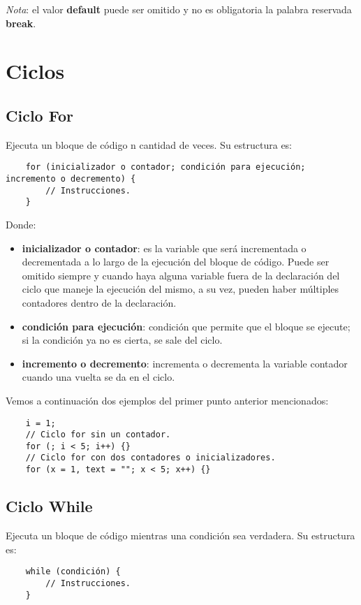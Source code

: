 \textit{Nota}: el valor \textbf{default} puede ser omitido y no es obligatoria la palabra reservada \textbf{break}.



\section{Ciclos}

\subsection{Ciclo For}
\hspace{0.55cm}Ejecuta un bloque de código n cantidad de veces. Su estructura es:
\begin{lstlisting}
    for (inicializador o contador; condición para ejecución; incremento o decremento) {
        // Instrucciones.
    }
\end{lstlisting}

Donde:
\begin{itemize}
    \item \textbf{inicializador o contador}: es la variable que será incrementada o decrementada a lo largo de la ejecución del bloque de código. Puede ser omitido siempre y cuando haya alguna variable fuera de la declaración del ciclo que maneje la ejecución del mismo, a su vez, pueden haber múltiples contadores dentro de la declaración.
    \item \textbf{condición para ejecución}: condición que permite que el bloque se ejecute; si la condición ya no es cierta, se sale del ciclo.
    \item \textbf{incremento o decremento}: incrementa o decrementa la variable contador cuando una vuelta se da en el ciclo.
\end{itemize}

Vemos a continuación dos ejemplos del primer punto anterior mencionados:
\begin{lstlisting}
    i = 1;
    // Ciclo for sin un contador.
    for (; i < 5; i++) {}
    // Ciclo for con dos contadores o inicializadores.
    for (x = 1, text = ""; x < 5; x++) {}
\end{lstlisting}


\subsection{Ciclo While}
\hspace{0.55cm}Ejecuta un bloque de código mientras una condición sea verdadera. Su estructura es:
\begin{lstlisting}
    while (condición) {
        // Instrucciones.
    }
\end{lstlisting}

